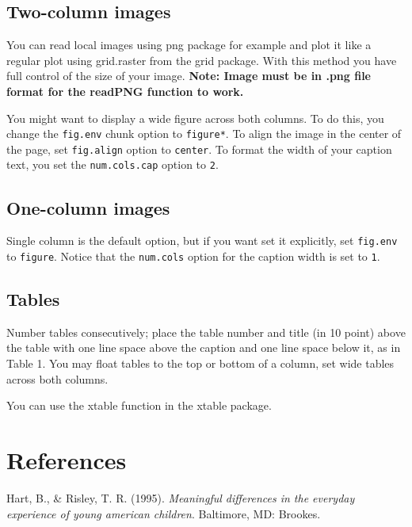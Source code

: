 \documentclass[10pt, letterpaper]{article}
\begin{document}
\subsection{Two-column images}\label{two-column-images}

You can read local images using png package for example and plot it like
a regular plot using grid.raster from the grid package. With this method
you have full control of the size of your image. \textbf{Note: Image
must be in .png file format for the readPNG function to work.}

You might want to display a wide figure across both columns. To do this,
you change the \texttt{fig.env} chunk option to \texttt{figure*}. To
align the image in the center of the page, set \texttt{fig.align} option
to \texttt{center}. To format the width of your caption text, you set
the \texttt{num.cols.cap} option to \texttt{2}.

\subsection{One-column images}\label{one-column-images}

Single column is the default option, but if you want set it explicitly,
set \texttt{fig.env} to \texttt{figure}. Notice that the
\texttt{num.cols} option for the caption width is set to \texttt{1}.

\subsection{Tables}\label{tables}

Number tables consecutively; place the table number and title (in 10
point) above the table with one line space above the caption and one
line space below it, as in Table 1. You may float tables to the top or
bottom of a column, set wide tables across both columns.

You can use the xtable function in the xtable package.

\section{References}\label{references}

\setlength{\parindent}{-0.1in} \setlength{\leftskip}{0.125in} \noindent

\hypertarget{refs}{}
\hypertarget{ref-Hart1995}{}
Hart, B., \& Risley, T. R. (1995). \emph{Meaningful differences in the
everyday experience of young american children}. Baltimore, MD: Brookes.
\end{document}
